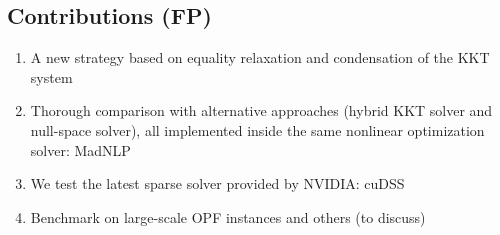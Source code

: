 \subsection{Contributions (FP)}
\begin{enumerate}
  \item A new strategy based on equality relaxation
    and condensation of the KKT system
  \item Thorough comparison with alternative approaches
    (hybrid KKT solver and null-space solver), all implemented
    inside the same nonlinear optimization solver: MadNLP
  \item We test the latest sparse solver provided
    by NVIDIA: cuDSS
  \item Benchmark on large-scale OPF instances
    and others (to discuss)
\end{enumerate}
